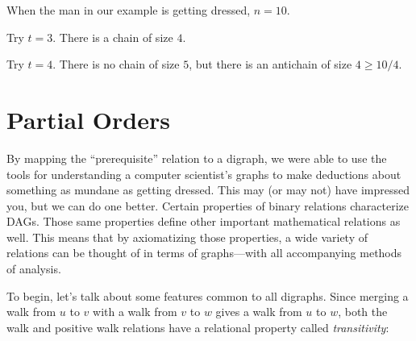 \begin{definition}
\begin{example}
When the man in our example is getting dressed, $n = 10$.

Try $t = 3$.  There is a chain of size $4$.

Try $t = 4$.  There is no chain of size $5$, but there is an antichain of
size $4 \geq 10 / 4$.
\end{example}

\iffalse
\begin{example}
Suppose we have a class of 101 students.  Then using the product partial
order, $Y$, from Example~\ref{Y}, we can apply Dilworth's Lemma to
conclude that there is a chain of 11 students who get taller as they get
older, or an antichain of 11 students who get taller as they get younger,
which makes for an amusing in-class demo.
\end{example}
\fi

\begin{problems}
\practiceproblems
{}
{}

\classproblems
{}


\homeworkproblems
{}


\end{problems}

\section{Partial Orders}

By mapping the ``prerequisite'' relation to a digraph, we were able to
use the tools for understanding a computer scientist's graphs to make
deductions about something as mundane as getting dressed. This may (or
may not) have impressed you, but we can do one better. Certain
properties of binary relations characterize DAGs.  Those same
properties define other important mathematical relations as well.
This means that by axiomatizing those properties, a wide variety of
relations can be thought of in terms of graphs---with all accompanying
methods of analysis.

To begin, let's talk about some features common to all digraphs.
Since merging a walk from $u$ to $v$ with a walk from $v$ to $w$ gives
a walk from $u$ to $w$, both the walk and positive walk relations have
a relational property called \emph{transitivity}:


\end{definition}
